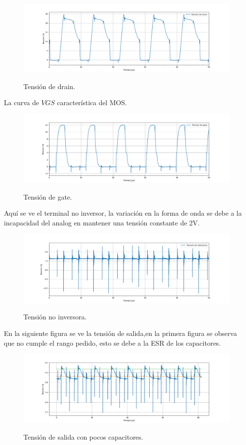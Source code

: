 \begin{figure}[H]
	\centering
	\includegraphics[width=0.9\linewidth]{ImagenesParteIV/Vds.png}
	\label{fig:vds_4}
	\caption{Tensión de drain.}
\end{figure}
La curva de $V{GS}$ característica del MOS. 
\begin{figure}[H]
	\centering
	\includegraphics[width=0.9\linewidth]{ImagenesParteIV/Vgs.png}
	\label{fig:vgs_4}
	\caption{Tensión de gate.}
\end{figure}
Aquí se ve el terminal no inversor, la variación en la forma de onda se debe a la incapacidad del analog en mantener una tensión constante de 2V.
\begin{figure}[H]
	\centering	\includegraphics[width=0.9\linewidth]{ImagenesParteIV/Vref.png}
	\label{fig:vni_4}
	\caption{Tensión no inversora.}
\end{figure}

En la siguiente figura se ve  la tensión de salida,en la primera figura se observa que no cumple el rango pedido, esto se debe a la ESR de los capacitores.
\begin{figure}[H]
	\centering	\includegraphics[width=0.9\linewidth]{ImagenesParteIV/Vout_vieja.png}
	\label{fig:vout_4_v}
	\caption{Tensión de salida con pocos capacitores.}
\end{figure}

